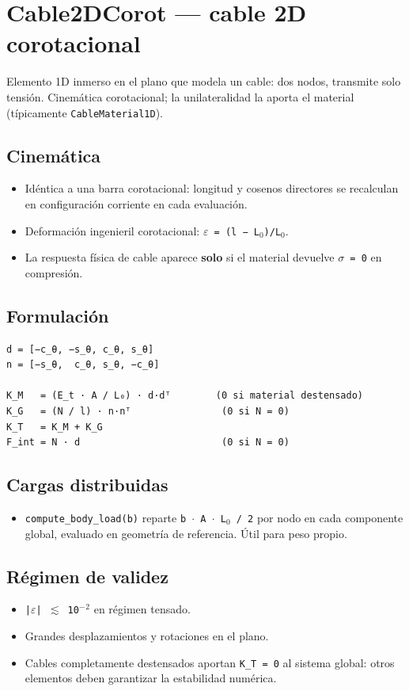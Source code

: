 \documentclass[11pt,letterpaper,oneside]{report}
\begin{document}
\section{Cable2DCorot --- cable 2D corotacional}

Elemento 1D inmerso en el plano que modela un cable: dos nodos, transmite solo tensión. Cinemática corotacional; la unilateralidad la aporta el material (típicamente \texttt{CableMaterial1D}).

\subsection{Cinemática}
\begin{itemize}
  \item Idéntica a una barra corotacional: longitud y cosenos directores se recalculan en configuración corriente en cada evaluación.
  \item Deformación ingenieril corotacional: \texttt{\ensuremath{\varepsilon} = (l − L\ensuremath{_{0}})/L\ensuremath{_{0}}}.
  \item La respuesta física de cable aparece \textbf{solo} si el material devuelve \texttt{\ensuremath{\sigma} = 0} en compresión.
\end{itemize}

\subsection{Formulación}
\begin{lstlisting}
d = [−c_θ, −s_θ, c_θ, s_θ]
n = [−s_θ,  c_θ, s_θ, −c_θ]

K_M   = (E_t · A / L₀) · d·dᵀ        (0 si material destensado)
K_G   = (N / l) · n·nᵀ                (0 si N = 0)
K_T   = K_M + K_G
F_int = N · d                         (0 si N = 0)

\end{lstlisting}

\subsection{Cargas distribuidas}
\begin{itemize}
  \item \texttt{compute\_body\_load(b)} reparte \texttt{b \ensuremath{\cdot} A \ensuremath{\cdot} L\ensuremath{_{0}} / 2} por nodo en cada componente global, evaluado en geometría de referencia. Útil para peso propio.
\end{itemize}

\subsection{Régimen de validez}
\begin{itemize}
  \item \texttt{|\ensuremath{\varepsilon}| \ensuremath{\lesssim} 10\ensuremath{^{-}}\ensuremath{^{2}}} en régimen tensado.
  \item Grandes desplazamientos y rotaciones en el plano.
  \item Cables completamente destensados aportan \texttt{K\_T = 0} al sistema global: otros elementos deben garantizar la estabilidad numérica.
\end{itemize}
\end{document}
